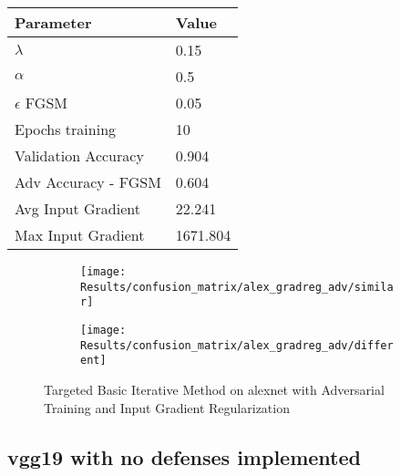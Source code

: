 \documentclass[draft,final]{vutinfth} %
\begin{document}
\begin{table}[h]
  \centering
  \begin{tabular}{ll}
    \toprule
			Parameter			& Value   \\
    \midrule
			$\lambda$								& 0.15		\\
			$\alpha$								& 0.5			\\
			$\epsilon$ FGSM					& 0.05		\\
			Epochs training					& 10			\\
			
			Validation Accuracy			& 0.904		\\
			Adv Accuracy - FGSM			& 0.604		\\
			
			Avg Input Gradient			& 22.241	\\
			Max Input Gradient			& 1671.804\\
    \bottomrule
  \end{tabular}
\end{table}

\begin{figure}[h]
  \begin{subfigure}[b]{0.5\columnwidth}
		\centering
    \texttt{[image: Results/confusion\_matrix/alex\_gradreg\_adv/similar]}
    \label{fig:exp:cm:alex_gradreg_adv:similar}
  \end{subfigure}
  \begin{subfigure}[b]{0.5\columnwidth}
		\centering
    \texttt{[image: Results/confusion\_matrix/alex\_gradreg\_adv/different]}
    \label{fig:exp:cm:alex_gradreg_adv:different}
  \end{subfigure}
  \caption{Targeted Basic Iterative Method on alexnet with Adversarial Training and Input Gradient Regularization}
	\label{fig:exp:cm:alex_gradreg_adv}
\end{figure}
\clearpage


\subsection{vgg19 with no defenses implemented}
\end{document}

